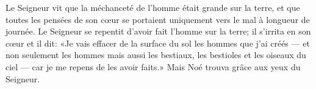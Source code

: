 Le Seigneur vit que la méchanceté de l’homme était grande sur la terre,
	et que toutes les pensées de son cœur
	se portaient uniquement vers le mal à longueur de journée.
Le Seigneur se repentit d’avoir fait l’homme sur la terre;
	il s’irrita en son cœur et il dit:
	«Je vais effacer de la surface du sol les hommes que j’ai créés
	--- et non seulement les hommes mais aussi les bestiaux,
	les bestioles et les oiseaux du ciel ---
	car je me repens de les avoir faits.»
Mais Noé trouva grâce aux yeux du Seigneur.
